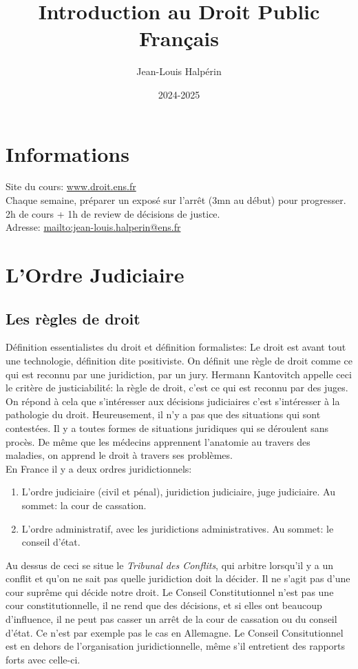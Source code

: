 \documentclass[math]{cours}
\author{Jean-Louis Halpérin}
\title{Introduction au Droit Public Français}
\date{2024-2025}
\begin{document}
\bettertitle

\section*{Informations}
Site du cours: \url{www.droit.ens.fr}\\
Chaque semaine, préparer un exposé sur l'arrêt (3mn au début) pour progresser. 2h de cours + 1h de review de décisions de justice.\\
Adresse: \url{mailto:jean-louis.halperin@ens.fr}

\section{L'Ordre Judiciaire}
\subsection{Les règles de droit}
Définition essentialistes du droit et définition formalistes: Le droit est avant tout une technologie, définition dite positiviste.
On définit une règle de droit comme ce qui est reconnu par une juridiction, par un jury.
Hermann Kantovitch appelle ceci le critère de justiciabilité: la règle de droit, c'est ce qui est reconnu par des juges.
On répond à cela que s'intéresser aux décisions judiciaires c'est s'intéresser à la pathologie du droit.
Heureusement, il n'y a pas que des situations qui sont contestées.
Il y a toutes formes de situations juridiques qui se déroulent sans procès.
De même que les médecins apprennent l'anatomie au travers des maladies, on apprend le droit à travers ses problèmes. \\

En France il y a deux ordres juridictionnels:
\begin{enumerate}
	\item L'ordre judiciaire (civil et pénal), juridiction judiciaire, juge judiciaire. Au sommet: la cour de cassation.
	\item L'ordre administratif, avec les juridictions administratives. Au sommet: le conseil d'état.
\end{enumerate}
Au dessus de ceci se situe le \emph{Tribunal des Conflits}, qui arbitre lorsqu'il y a un conflit et qu'on ne sait pas quelle juridiction doit la décider.
Il ne s'agit pas d'une cour suprême qui décide notre droit.
Le Conseil Constitutionnel n'est pas une cour constitutionnelle, il ne rend que des décisions, et si elles ont beaucoup d'influence, il ne peut pas casser un arrêt de la cour de cassation ou du conseil d'état.
Ce n'est par exemple pas le cas en Allemagne.
Le Conseil Consitutionnel est en dehors de l'organisation juridictionnelle, même s'il entretient des rapports forts avec celle-ci.
\end{document}
